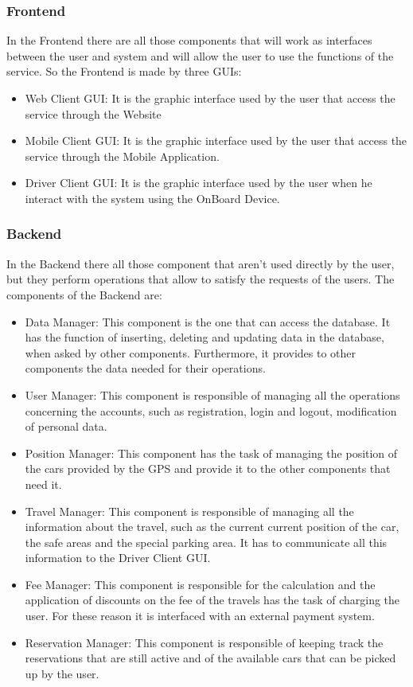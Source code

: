 \subsubsection{Frontend}
In the Frontend there are all those components that will work as interfaces between the user and system and will allow the user to use the functions of the service. So the Frontend is made by three GUIs:
\begin{itemize}
\item Web Client GUI: It is the graphic interface used by the user that access the service through the Website
\item Mobile Client GUI: It is the graphic interface used by the user that access the service through the Mobile Application.
\item Driver Client GUI: It is the graphic interface used by the user when he interact with the system using the OnBoard Device.
\end{itemize}

\subsubsection{Backend}
In the Backend there all those component that aren't used directly by the user, but they perform operations that allow to satisfy the requests of the users. The components of the Backend are:
\begin{itemize}
\item Data Manager: This component is the one that can access the database. It has the function of inserting, deleting and updating data in the database, when asked by other components. Furthermore, it provides to other components the data needed for their operations.
\item User Manager: This component is responsible of managing all the operations concerning the accounts, such as registration, login and logout, modification of personal data.
\item Position Manager: This component has the task of managing the position of the cars provided by the GPS and provide it to the other components that need it. 
\item Travel Manager: This component is responsible of managing all the information about the travel, such as the current current position of the car, the safe areas and the special parking area. It has to communicate all this information to the Driver Client GUI.
\item Fee Manager: This component is responsible for the calculation and the application of discounts on the fee of the travels has the task of charging the user. For these reason it is interfaced with an external payment system.
\item Reservation Manager: This component is responsible of keeping track the reservations that are still active and of the available cars that can be picked up by the user.

\end{itemize}

